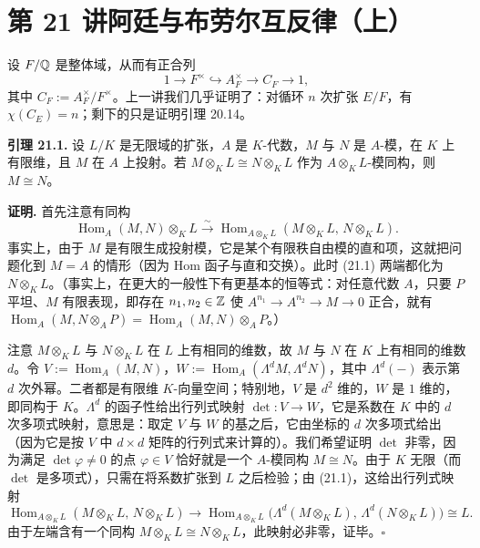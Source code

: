 \section*{第 21 讲\quad 阿廷与布劳尔互反律（上）}

设 $F/\mathbb{Q}$ 是整体域，从而有正合列
\[
1\to F^\times\hookrightarrow A_F^\times\to C_F\to 1,
\]
其中 $C_F:=A_F^\times/F^\times$。上一讲我们几乎证明了：对循环 $n$ 次扩张 $E/F$，有 $\chi(C_E)=n$；剩下的只是证明引理 20.14。

\textbf{引理 21.1.} 设 $L/K$ 是无限域的扩张，$A$ 是 $K$-代数，$M$ 与 $N$ 是 $A$-模，在 $K$ 上有限维，且 $M$ 在 $A$ 上投射。若 $M\otimes_K L\cong N\otimes_K L$ 作为 $A\otimes_K L$-模同构，则 $M\cong N$。

\textbf{证明.} 首先注意有同构
\begin{equation}\tag{21.1}
\operatorname{Hom}_A(M,N)\otimes_K L\xrightarrow{\sim}\operatorname{Hom}_{A\otimes_K L}(M\otimes_K L,\,N\otimes_K L).
\end{equation}
事实上，由于 $M$ 是有限生成投射模，它是某个有限秩自由模的直和项，这就把问题化到 $M=A$ 的情形（因为 Hom 函子与直和交换）。此时 (21.1) 两端都化为 $N\otimes_K L$。（事实上，在更大的一般性下有更基本的恒等式：对任意代数 $A$，只要 $P$ 平坦、$M$ 有限表现，即存在 $n_1,n_2\in\mathbb{Z}$ 使 $A^{n_1}\to A^{n_2}\to M\to 0$ 正合，就有 $\operatorname{Hom}_A(M,N\otimes_A P)=\operatorname{Hom}_A(M,N)\otimes_A P$。）

注意 $M\otimes_K L$ 与 $N\otimes_K L$ 在 $L$ 上有相同的维数，故 $M$ 与 $N$ 在 $K$ 上有相同的维数 $d$。令 $V:=\operatorname{Hom}_A(M,N)$，$W:=\operatorname{Hom}_A(\Lambda^dM,\Lambda^dN)$，其中 $\Lambda^d(-)$ 表示第 $d$ 次外幂。二者都是有限维 $K$-向量空间；特别地，$V$ 是 $d^2$ 维的，$W$ 是 $1$ 维的，即同构于 $K$。$\Lambda^d$ 的函子性给出行列式映射 $\det:V\to W$，它是系数在 $K$ 中的 $d$ 次多项式映射，意思是：取定 $V$ 与 $W$ 的基之后，它由坐标的 $d$ 次多项式给出（因为它是按 $V$ 中 $d\times d$ 矩阵的行列式来计算的）。我们希望证明 $\det$ 非零，因为满足 $\det\varphi\neq0$ 的点 $\varphi\in V$ 恰好就是一个 $A$-模同构 $M\cong N$。由于 $K$ 无限（而 $\det$ 是多项式），只需在将系数扩张到 $L$ 之后检验；由 (21.1)，这给出行列式映射
\[
\operatorname{Hom}_{A\otimes_KL}(M\otimes_KL,\,N\otimes_KL)\to\operatorname{Hom}_{A\otimes_KL}\bigl(\Lambda^d(M\otimes_KL),\,\Lambda^d(N\otimes_KL)\bigr)\cong L.
\]
由于左端含有一个同构 $M\otimes_KL\cong N\otimes_KL$，此映射必非零，证毕。\hfill$\square$

